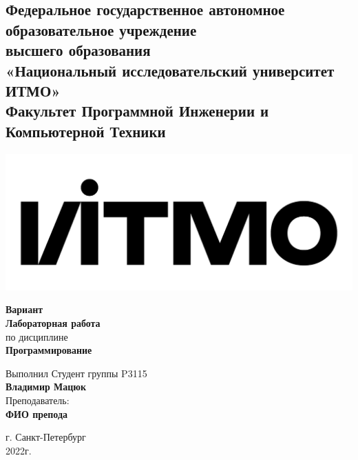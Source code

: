 \documentclass{article}
\begin{document}
\begin{center}
  \section*{
    Федеральное государственное автономное образовательное учреждение\\ высшего образования\\
    «Национальный исследовательский университет ИТМО»\\
    Факультет Программной Инженерии и Компьютерной Техники \\
   }
  \includegraphics[scale=0.2]{../../img/itmo.png}
\end{center}
\vspace{4cm}


\begin{center}
  \large \textbf{Вариант }\\
  \textbf{Лабораторная работа }\\
  по дисциплине\\
  \textbf{Программирование}
\end{center}

\vspace*{\fill}

\begin{flushright}
  Выполнил Студент группы P3115\\
  \textbf{Владимир Мацюк}\\
  Преподаватель: \\
  \textbf{ФИО препода}\\
\end{flushright}

\vspace{1cm}

\begin{center}
  г. Санкт-Петербург\\
  2022г.
\end{center}

\newpage
\end{document}
